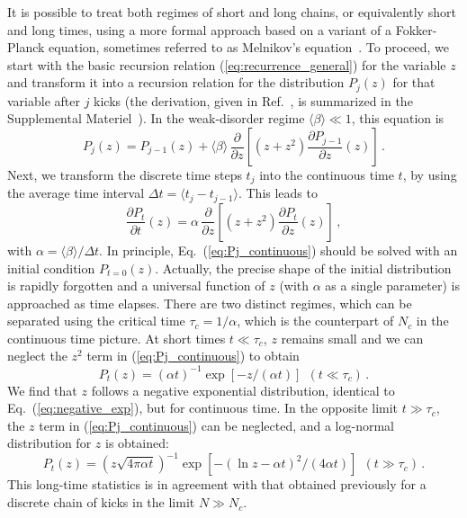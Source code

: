 \documentclass[ prl, twocolumn, superscriptaddress, amsfonts, amsmath,floatfix]{revtex4-1}
\begin{document}
It is possible to treat both regimes of short and long chains, or equivalently short and long times, using a more formal approach based on a variant of a Fokker-Planck equation, sometimes referred to as Melnikov's equation~\cite{Melnikov_etal}. To proceed, we start with the basic recursion relation (\ref{eq:recurrence_general}) for the variable $z$ and transform it into a recursion relation for the distribution $P_j(z)$ for that variable after $j$ kicks {(the derivation, given in Ref.~\cite{Melnikov_etal}, is summarized in the Supplemental Materiel~\cite{SM})}. In the weak-disorder regime $\langle \beta \rangle \ll 1$, this equation is
\begin{equation}
P_j(z) = P_{j-1}(z) + \langle \beta \rangle \, \frac{\partial}{\partial z} \left [(z+z^2)  \frac{\partial P_{j-1}}{\partial z}(z) \right ] \, .
\end{equation}
Next, we transform the discrete time steps $t_j$ into the continuous time $t$, by using the average time interval $\Delta t = \langle t_j - t_{j-1} \rangle$. This leads to
\begin{equation}
\frac{\partial P_t}{\partial t}(z) = \alpha \, \frac{\partial}{\partial z} \left [ (z+z^2)  \frac{\partial P_t}{\partial z}(z) \right ] \, ,
\label{eq:Pj_continuous}
\end{equation}
with $\alpha = \langle \beta \rangle/\Delta t$. 
In principle, Eq.~(\ref{eq:Pj_continuous}) should be solved with an initial condition $P_{t=0}(z)$. Actually, the precise shape of the initial distribution is rapidly forgotten and a universal function of $z$ (with $\alpha$ as a single parameter) is approached as time elapses. There are two distinct regimes, which can be separated using the critical time $\tau_c = 1/\alpha$, which is the counterpart of $N_c$ in the continuous time picture. At short times $t \ll \tau_c$, $z$ remains small and we can neglect the $z^2$ term in (\ref{eq:Pj_continuous}) to obtain
\begin{equation}
P_t(z) = (\alpha t)^{-1} \exp[-z/(\alpha t)] \ \ (t \ll \tau_c) \, .
\end{equation}
We find that $z$ follows a negative exponential distribution, identical to Eq.~(\ref{eq:negative_exp}), but for continuous time. In the opposite limit $t \gg \tau_c$, the $z$ term in (\ref{eq:Pj_continuous}) can be neglected, and a log-normal distribution for $z$ is obtained:
\begin{equation}
P_t(z) = (z \sqrt{4\pi\alpha t})^{-1} \exp[-(\ln z - \alpha t)^2/(4 \alpha t)] \ \ (t \gg \tau_c) \, .
\end{equation}
This long-time statistics is in agreement with that obtained previously for a discrete chain of kicks in the limit $N \gg N_c$. 
\end{document}

